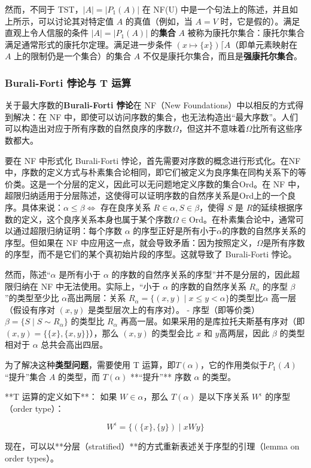 然而，不同于 TST，\( |A| = |P_1(A)| \) 在 NF(U) 中是一个句法上的陈述，并且如上所示，可以讨论其对特定值 \( A \) 的真值（例如，当 \( A = V \) 时，它是假的）。满足直观上令人信服的条件 \( |A| = |P_1(A)| \) 的\textbf{集合} \( A \) 被称为康托尔集合：康托尔集合满足通常形式的康托尔定理。满足进一步条件 \((x \mapsto \{x\}) \lceil A\)（即单元素映射在 \( A \) 上的限制仍是一个集合）的集合 \( A \) 不仅是康托尔集合，而且是\textbf{强康托尔集合}。
\subsubsection{Burali-Forti 悖论与 T 运算 } 
关于最大序数的\textbf{Burali-Forti 悖论}在 NF（New Foundations）中以相反的方式得到解决：在 NF 中，即使可以访问序数的集合，也无法构造出“最大序数”。人们可以构造出对应于所有序数的自然良序的序数\( \Omega \)，但这并不意味着\(\Omega \)比所有这些序数都大。

要在 NF 中形式化 Burali-Forti 悖论，首先需要对序数的概念进行形式化。在NF中，序数的定义方式与朴素集合论相同，即它们被定义为良序集在同构关系下的等价类。这是一个分层的定义，因此可以无问题地定义序数的集合\( \mathrm{Ord} \)。在 NF 中，超限归纳适用于分层陈述，这使得可以证明序数的自然序关系是\( \mathrm{Ord} \)上的一个良序。具体来说：\(\alpha \leq \beta \iff \text{ 存在良序关系 } R \in \alpha, S \in \beta \text{，使得 } S \text{ 是 } R \text{的延续}\)根据序数的定义，这个良序关系本身也属于某个序数\(\Omega \in \mathrm{Ord}\)。在朴素集合论中，通常可以通过超限归纳证明：每个序数 \( \alpha \) 的序型正好是所有小于\( \alpha \)的序数的自然序关系的序型。但如果在 NF 中应用这一点，就会导致矛盾：因为按照定义，\( \Omega \)是所有序数的序型，而不是它们的某个真初始片段的序型。这就导致了 Burali-Forti 悖论。

然而，陈述“\( \alpha \) 是所有小于 \( \alpha \) 的序数的自然序关系的序型”并不是分层的，因此超限归纳在 NF 中无法使用。实际上，“小于 \( \alpha \) 的序数的自然序关系 \( R_{\alpha} \) 的序型 \( \beta \)”的类型至少比 \( \alpha \)高出两层：关系 \( R_{\alpha} = \{(x, y) \mid x \leq y < \alpha\} \)的类型比\( \alpha \) 高一层（假设有序对 \( (x, y) \) 是类型层次上的有序对）。
- 序型（即等价类）\( \beta = \{S \mid S \sim R_{\alpha}\} \) 的类型比 \( R_{\alpha} \) 再高一层。如果采用的是库拉托夫斯基有序对（即 \( (x, y) = \{\{x\}, \{x, y\}\} \)），那么 \( (x, y) \) 的类型会比 \( x \) 和 \( y \)高两层，因此 \( \beta \) 的类型相对于 \( \alpha \) 总共会高出四层。

为了解决这种\textbf{类型问题}，需要使用 T 运算，即\( T(\alpha)\)，它的作用类似于\( P_1(A) \)“提升”集合 \( A \) 的类型，而 \( T(\alpha) \) **“提升”** 序数 \( \alpha \) 的类型。

**T 运算的定义如下**：  
如果 \( W \in \alpha \)，那么 \( T(\alpha) \) 是以下序关系 \( W^{\iota} \) 的序型（order type）：

\[
W^{\iota} = \{(\{x\}, \{y\}) \mid x W y\}
\]

现在，可以以**分层（stratified）**的方式重新表述关于序型的引理（lemma on order types）。